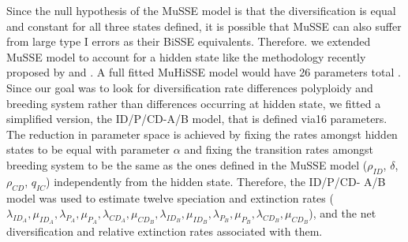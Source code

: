 
Since the null hypothesis of the MuSSE model is that the diversification is equal and constant for all three states defined, it is possible that MuSSE can also suffer from large type I errors as their BiSSE equivalents. Therefore. we extended MuSSE model to account for a hidden state like the methodology recently proposed by \citet{caetano_2018} and \citet{herrera_2018}. A full fitted MuHiSSE model would have 26 parameters total \citep{herrera_2018}. Since our goal was to look for diversification rate differences polyploidy and breeding system rather than differences occurring at  hidden state, we fitted a simplified version, the  ID/P/CD-A/B model, that is defined via16 parameters. The reduction in parameter space is achieved by fixing the rates amongst hidden states to be equal with parameter $\alpha$ and fixing the transition rates amongst breeding system to be the same as  the ones defined in the MuSSE model ($\rho_{ID}$,  $\delta$,  $\rho_{CD}$,  $q_{IC}$) independently from the hidden state.   Therefore, the ID/P/CD- A/B model was used to estimate twelve speciation and extinction rates ($\lambda_{ID_A}, \mu_{ID_A},\lambda_{P_A},\mu_{P_A}, \lambda_{CD_A},\mu_{CD_B},\lambda_{ID_B}, \mu_{ID_B},\lambda_{P_B},\mu_{P_B}, \lambda_{CD_B},\mu_{CD_B}$), and the net diversification and relative extinction rates associated with them.\newline

